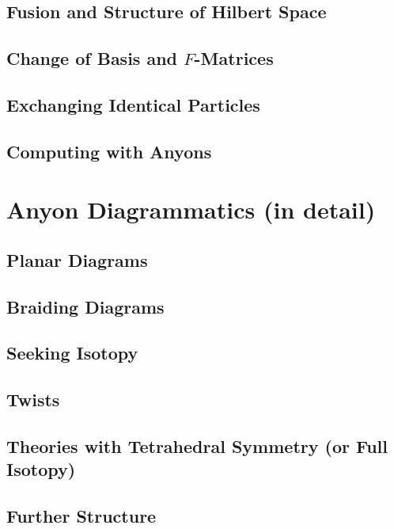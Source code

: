 \documentclass{book}
\begin{document}
\chapter{Fusion and Structure of Hilbert Space}


\chapter{Change of Basis and $F$-Matrices}


\chapter{Exchanging Identical Particles}


\chapter{Computing with Anyons}


\part{Anyon Diagrammatics (in detail)}

\chapter{Planar Diagrams}


\chapter{Braiding Diagrams}


\chapter{Seeking Isotopy}


\chapter{Twists}


\chapter{Theories with Tetrahedral Symmetry (or Full Isotopy)}


\chapter{Further Structure}




\end{document}
